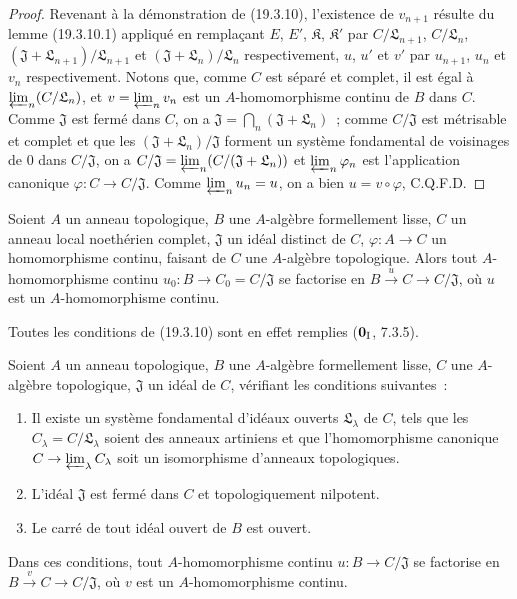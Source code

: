\begin{proof}
Revenant à la démonstration de (19.3.10), l'existence de $v_{n+1}$ résulte du lemme (19.3.10.1) appliqué en remplaçant
$E$, $E'$, $\mathfrak K$, $\mathfrak K'$ par
$C/\mathfrak L_{n+1}$, $C/\mathfrak L_n$,
$(\mathfrak J+\mathfrak L_{n+1})/\mathfrak L_{n+1}$ et
$(\mathfrak J+\mathfrak L_n)/\mathfrak L_n$ respectivement, $u$, $u'$
et $v'$ par $u_{n+1}$, $u_n$ et $v_n$ respectivement. Notons que, comme $C$
est séparé et complet, il est égal à $\varprojlim_n(C/\mathfrak L_n)$, et
$v=\varprojlim_n v_n$ est un $A$-homomorphisme continu de $B$ dans $C$.
Comme $\mathfrak J$ est fermé dans $C$, on a
$\mathfrak J=\bigcap_n(\mathfrak J+\mathfrak L_n)$~; comme
$C/\mathfrak J$ est métrisable et complet et que les
$(\mathfrak J+\mathfrak L_n)/\mathfrak J$ forment un système fondamental
de voisinages de $0$ dans $C/\mathfrak J$, on a
$C/\mathfrak J=\varprojlim_n(C/(\mathfrak J+\mathfrak L_n))$
et $\varprojlim_n\varphi_n$ est l'application canonique
$\varphi:C\to C/\mathfrak J$. Comme $\varprojlim_n u_n=u$, on a bien
$u=v\circ\varphi$, C.Q.F.D.
\end{proof}

\begin{corollary}[19.3.11]
\label{0.19.3.11-fr}
Soient $A$ un anneau topologique, $B$ une $A$-algèbre formellement lisse,
$C$ un anneau local noethérien complet, $\mathfrak J$ un idéal distinct de
$C$, $\varphi:A\to C$ un homomorphisme continu, faisant de $C$ une
$A$-algèbre topologique. Alors tout $A$-homomorphisme continu
$u_0:B\to C_0=C/\mathfrak J$ se factorise en
$B\xrightarrow{u}C\to C/\mathfrak J$, où $u$ est un $A$-homomorphisme
continu.
\end{corollary}

Toutes les conditions de (19.3.10) sont en effet remplies
($\mathbf 0_{\rm I}$, 7.3.5).

\begin{proposition}[19.3.12]
\label{0.19.3.12-fr}
Soient $A$ un anneau topologique, $B$ une $A$-algèbre formellement lisse,
$C$ une $A$-algèbre topologique, $\mathfrak J$ un idéal de $C$, vérifiant les
conditions suivantes~:
\begin{enumerate}
  \item[$1^\circ$] Il existe un système fondamental d'idéaux ouverts
  $\mathfrak L_\lambda$ de $C$, tels que les
  $C_\lambda=C/\mathfrak L_\lambda$ soient des anneaux artiniens et que
  l'homomorphisme canonique $C\to\varprojlim_\lambda C_\lambda$ soit un
  isomorphisme d'anneaux topologiques.
  \item[$2^\circ$] L'idéal $\mathfrak J$ est fermé dans $C$ et
  topologiquement nilpotent.
  \item[$3^\circ$] Le carré de tout idéal ouvert de $B$ est ouvert.
\end{enumerate}

Dans ces conditions, tout $A$-homomorphisme continu
$u:B\to C/\mathfrak J$ se factorise en
$B\xrightarrow{v}C\to C/\mathfrak J$, où $v$ est un $A$-homomorphisme
continu.
\end{proposition}

